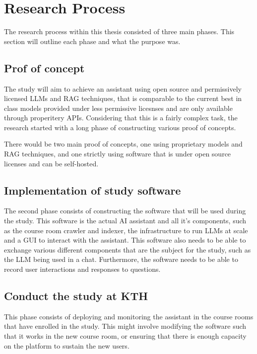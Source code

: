 \section{Research Process}
\label{sec:research_process}


The research process within this thesis consisted of three main phases. This section will outline each phase and what the purpose was.


\subsection{Prof of concept}


The study will aim to achieve an assistant using open source and permissively licensed \gls{LLM}s and \gls{RAG} techniques, that is comparable to the current best in class models provided under less permissive licesnses and are only available through properitery APIs. Considering that this is a fairly complex task, the research started with a long phase of constructing various proof of concepts.


There would be two main proof of concepts, one using proprietary models and \gls{RAG} techniques, and one strictly using software that is under open source licenses and can be self-hosted.


\subsection{Implementation of study software}


The second phase consists of constructing the software that will be used during the study. This software is the actual AI assistant and all it’s components, such as the course room crawler and indexer, the infrastructure to run \gls{LLM}s at scale and a \gls{GUI} to interact with the assistant. This software also needs to be able to exchange various different components that are the subject for the study, such as the \gls{LLM} being used in a chat. Furthermore, the software needs to be able to record user interactions and responses to questions.


\subsection{Conduct the study at KTH}


This phase consists of deploying and monitoring the assistant in the course rooms that have enrolled in the study. This might involve modifying the software such that it works in the new course room, or ensuring that there is enough capacity on the platform to sustain the new users.


